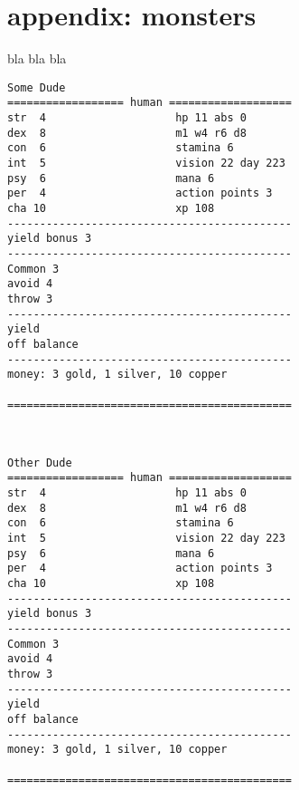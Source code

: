 \section*{appendix: monsters}

\raggedbottom

bla bla bla


\goodbreak \small \begin{samepage} \begin{verbatim}
Some Dude
================== human ===================
str  4                    hp 11 abs 0
dex  8                    m1 w4 r6 d8
con  6                    stamina 6
int  5                    vision 22 day 223
psy  6                    mana 6
per  4                    action points 3
cha 10                    xp 108
--------------------------------------------
yield bonus 3
--------------------------------------------
Common 3
avoid 4
throw 3
--------------------------------------------
yield
off balance
--------------------------------------------
money: 3 gold, 1 silver, 10 copper

============================================
\end{verbatim} \end{samepage} \normalsize

\

\goodbreak \small \begin{samepage} \begin{verbatim}
Other Dude
================== human ===================
str  4                    hp 11 abs 0
dex  8                    m1 w4 r6 d8
con  6                    stamina 6
int  5                    vision 22 day 223
psy  6                    mana 6
per  4                    action points 3
cha 10                    xp 108
--------------------------------------------
yield bonus 3
--------------------------------------------
Common 3
avoid 4
throw 3
--------------------------------------------
yield
off balance
--------------------------------------------
money: 3 gold, 1 silver, 10 copper

============================================
\end{verbatim} \end{samepage} \normalsize

\flushbottom





























